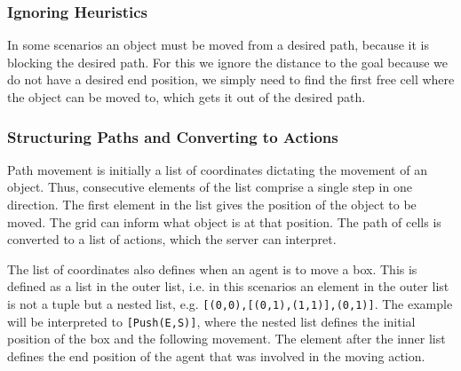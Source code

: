 \subsubsection{Ignoring Heuristics}

In some scenarios an object must be moved from a desired path, because it is blocking the desired path.
For this we ignore the distance to the goal because we do not have a desired end position, we simply need to find the first free cell where the object can be moved to, which gets it out of the desired path.

\subsubsection{Structuring Paths and Converting to Actions}

Path movement is initially a list of coordinates dictating the movement of an object.
Thus, consecutive elements of the list comprise a single step in one direction.
The first element in the list gives the position of the object to be moved.
The grid can inform what object is at that position.
The path of cells is converted to a list of actions, which the server can interpret.

The list of coordinates also defines when an agent is to move a box.
This is defined as a list in the outer list, i.e. in this scenarios an element in the outer list is not a tuple but a nested list, e.g. \texttt{[(0,0),[(0,1),(1,1)],(0,1)]}.
The example will be interpreted to \texttt{[Push(E,S)]}, where the nested list defines the initial position of the box and the following movement.
The element after the inner list defines the end position of the agent that was involved in the moving action.
